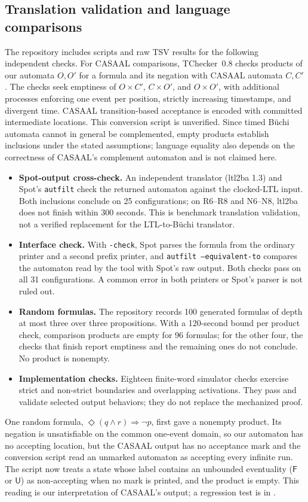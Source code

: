 \subsection{Translation validation and language comparisons}
\label{sec:validation}
The repository includes scripts and raw TSV results for the following
independent checks. For CASAAL comparisons, TChecker~0.8 checks products of
our automata $O,O'$ for a formula and its negation with CASAAL automata
$C,C'$. The checks seek emptiness of $O\times C'$, $C\times O'$, and
$O\times O'$, with additional processes enforcing one event per position,
strictly increasing timestamps, and divergent time. CASAAL transition-based
acceptance is encoded with committed intermediate locations. This conversion
script is unverified. Since timed B\"uchi automata cannot in general be
complemented, empty products establish inclusions under the stated
assumptions; language equality also depends on the correctness of CASAAL's
complement automaton and is not claimed here.
\begin{itemize}[leftmargin=*]
\item \textbf{Spot-output cross-check.} An independent translator (ltl2ba 1.3) and Spot's \texttt{autfilt} check the returned automaton against the clocked-LTL input. Both inclusions conclude on 25 configurations; on R6--R8 and N6--N8, ltl2ba does not finish within 300 seconds. This is benchmark translation validation, not a verified replacement for the LTL-to-B\"uchi translator.
\item \textbf{Interface check.} With \texttt{-check}, Spot parses the formula from the ordinary printer and a second prefix printer, and \texttt{autfilt --equivalent-to} compares the automaton read by the tool with Spot's raw output. Both checks pass on all 31 configurations. A common error in both printers or Spot's parser is not ruled out.
\item \textbf{Random formulas.} The repository records 100 generated formulas of depth at most three over three propositions. With a 120-second bound per product check, comparison products are empty for 96 formulas; for the other four, the checks that finish report emptiness and the remaining ones do not conclude. No product is nonempty.
\item \textbf{Implementation checks.} Eighteen finite-word simulator checks exercise strict and non-strict boundaries and overlapping activations. They pass and validate selected output behaviors; they do not replace the mechanized proof.
\end{itemize}
One random formula, $\Diamond(q\land r)\Rightarrow\neg p$, first gave a
nonempty product. Its negation is unsatisfiable on the common one-event
domain, so our automaton has no accepting location, but the CASAAL output
has no acceptance mark and the conversion script read an unmarked automaton
as accepting every infinite run. The script now treats a state whose label
contains an unbounded eventuality ($\mathsf F$ or $\mathsf U$) as
non-accepting when no mark is printed, and the product is empty. This
reading is our interpretation of CASAAL's output; a regression test is in
.
